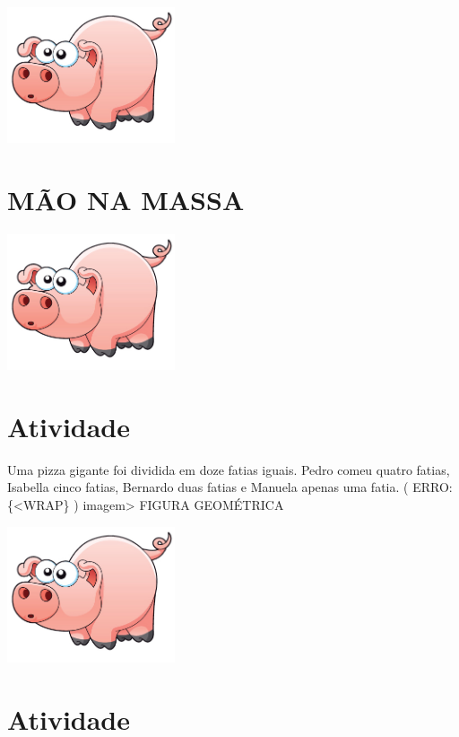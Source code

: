 \documentclass[a4,12pt]{book}
\begin{document}
\includegraphics[width=\textwidth,height=4cm, keepaspectratio]{pig}
\section*{ MÃO NA MASSA }





\includegraphics[width=\textwidth,height=4cm, keepaspectratio]{pig}
\section{Atividade}








Uma pizza gigante foi dividida em doze fatias iguais. 
Pedro comeu quatro fatias, Isabella cinco fatias, Bernardo duas fatias e Manuela apenas uma fatia.
( ERRO:\{<WRAP\} ) imagem> FIGURA GEOMÉTRICA 

\includegraphics[width=\textwidth,height=4cm, keepaspectratio]{pig}
\section{Atividade}
\end{document}
